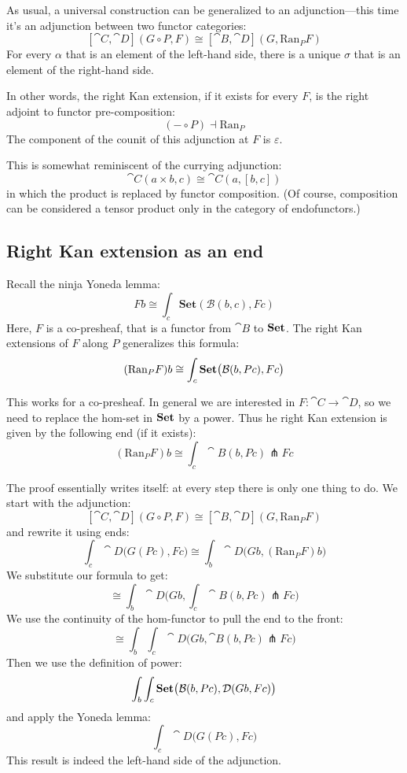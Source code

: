 \documentclass[DaoFP]{subfiles}
\begin{document}
As usual, a universal construction can be generalized to an adjunction---this time it's an adjunction between two functor categories:
\[ [\cat C, \cat D](G \circ P, F) \cong [\cat B, \cat D](G, \text{Ran}_P F) \]
For every $\alpha$ that is an element of the left-hand side, there is a unique $\sigma$ that is an element of the right-hand side.

In other words, the right Kan extension, if it exists for every $F$, is the right adjoint to functor pre-composition:
\[ (- \circ P) \dashv \text{Ran}_P \]
The component of the counit of this adjunction at $F$ is $\varepsilon$.

This is somewhat reminiscent of the currying adjunction:
\[ \cat C (a \times b, c) \cong \cat C (a, [b, c]) \]
in which the product is replaced by functor composition. (Of course, composition can be considered a tensor product only in the category of endofunctors.)

\subsection{Right Kan extension as an end}

Recall the ninja Yoneda lemma:
\[ F b \cong \int_{c} \mathbf{Set} (\mathcal{B}(b, c), F c) \]
Here, $F$ is a co-presheaf, that is a functor from $\cat B$ to $\mathbf{Set}$. The right Kan extensions of $F$ along $P$ generalizes this formula:
\[ (\text{Ran}_P F) b \cong \int_c \mathbf{Set} \big( \mathcal{B} (b, P c), F c\big) \]

This works for a co-presheaf. In general we are interested in $F \colon \cat C \to \cat D$, so we need to replace the hom-set in $\mathbf{Set}$ by a power. Thus he right Kan extension is given by the following end (if it exists):
 \[ (\text{Ran}_P F) b \cong \int_c \cat B (b, P c) \pitchfork F c \]
 
 The proof essentially writes itself: at every step there is only one thing to do. We start with the adjunction:
  \[ [\cat C, \cat D](G \circ P, F) \cong [\cat B, \cat D](G, \text{Ran}_P F) \]
and rewrite it using ends:
 \[ \int_c \cat D \big(G ( P c), F c\big) \cong \int_b \cat D\big(G b, (\text{Ran}_P F) b\big) \]
We substitute our formula to get:
 \[ \cong  \int_b \cat D\big(G b,\int_c \cat B (b, P c) \pitchfork F c \big)\]
We use the continuity of the hom-functor to pull the end to the front:
\[  \cong  \int_b \int_c \cat D\big(G b, \cat B (b, P c) \pitchfork F c \big) \]
Then we use the definition of power:
\[ \int_b \int_c \mathbf{Set} \big(  \mathcal{B} (b, P c), \mathcal{D} (G b, F c) \big) \]
and apply the Yoneda lemma:
\[ \int_c  \cat D \big(G (P c), F c\big) \]
This result is indeed the left-hand side of the adjunction.
 
\end{document}
